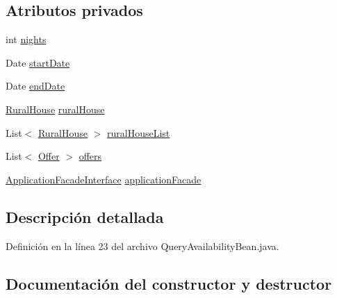 \subsection*{Atributos privados}
\begin{DoxyCompactItemize}
\item 
int \mbox{\hyperlink{classcom_1_1ruralhousejsf_1_1model_1_1availability_1_1_query_availability_bean_a4b06a08eab621f9fd6bf50ea4ae78a84}{nights}}
\item 
Date \mbox{\hyperlink{classcom_1_1ruralhousejsf_1_1model_1_1availability_1_1_query_availability_bean_a1652bdd9864dc46b9c0fb5e31282032d}{start\+Date}}
\item 
Date \mbox{\hyperlink{classcom_1_1ruralhousejsf_1_1model_1_1availability_1_1_query_availability_bean_ab8a7c45b5539243a1d4f82bc5ae24305}{end\+Date}}
\item 
\mbox{\hyperlink{classcom_1_1ruralhousejsf_1_1domain_1_1_rural_house}{Rural\+House}} \mbox{\hyperlink{classcom_1_1ruralhousejsf_1_1model_1_1availability_1_1_query_availability_bean_af0ec1e1e555ba7aecce40e6b7afb35e9}{rural\+House}}
\item 
List$<$ \mbox{\hyperlink{classcom_1_1ruralhousejsf_1_1domain_1_1_rural_house}{Rural\+House}} $>$ \mbox{\hyperlink{classcom_1_1ruralhousejsf_1_1model_1_1availability_1_1_query_availability_bean_aa73f1afe950fffe89af77ce0d5a46b70}{rural\+House\+List}}
\item 
List$<$ \mbox{\hyperlink{classcom_1_1ruralhousejsf_1_1domain_1_1_offer}{Offer}} $>$ \mbox{\hyperlink{classcom_1_1ruralhousejsf_1_1model_1_1availability_1_1_query_availability_bean_ab3faff791db6f04e1630faf15e6d4b6c}{offers}}
\item 
\mbox{\hyperlink{interfacecom_1_1ruralhousejsf_1_1business_logic_1_1_application_facade_interface}{Application\+Facade\+Interface}} \mbox{\hyperlink{classcom_1_1ruralhousejsf_1_1model_1_1availability_1_1_query_availability_bean_a0833a1cf9f0fdaa8301cccae085eead4}{application\+Facade}}
\end{DoxyCompactItemize}


\subsection{Descripción detallada}


Definición en la línea 23 del archivo Query\+Availability\+Bean.\+java.



\subsection{Documentación del constructor y destructor}
\mbox{\label{classcom_1_1ruralhousejsf_1_1model_1_1availability_1_1_query_availability_bean_a774769b2abae9a936441fcb0221f3cde}} 
